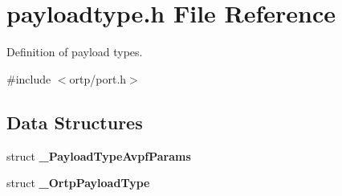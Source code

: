 \section{payloadtype.\+h File Reference}
\label{payloadtype_8h}


Definition of payload types.  


{\ttfamily \#include $<$ortp/port.\+h$>$}\newline
\subsection*{Data Structures}
\begin{DoxyCompactItemize}
\item 
struct \textbf{ \+\_\+\+Payload\+Type\+Avpf\+Params}
\item 
struct \textbf{ \+\_\+\+Ortp\+Payload\+Type}
\end{DoxyCompactItemize}
